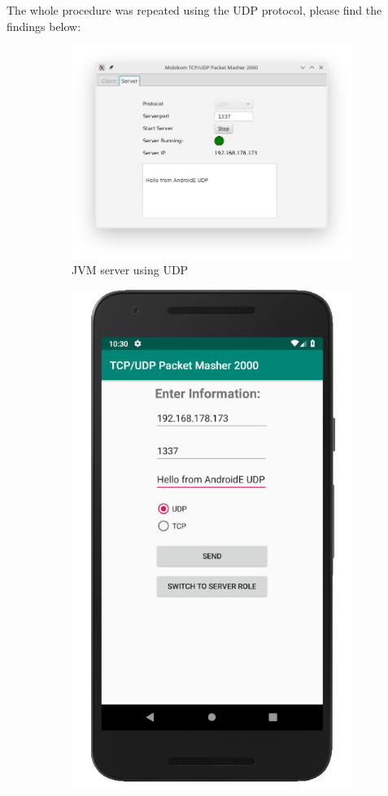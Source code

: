 The whole procedure was repeated using the UDP protocol, please find the findings below:\\

\begin{figure}[H]
	\centering
	\begin{subfigure}{.49\textwidth}
		\centering
		\includegraphics[width=1\linewidth]{images/task3/subtask1/jvmserverudp.png}
		\caption{JVM server using UDP}
	\end{subfigure}
	\begin{subfigure}{.49\textwidth}
		\centering
		\includegraphics[width=0.74\linewidth]{images/task3/subtask1/androidclientudp.png}

\end{subfigure}
\end{figure}
